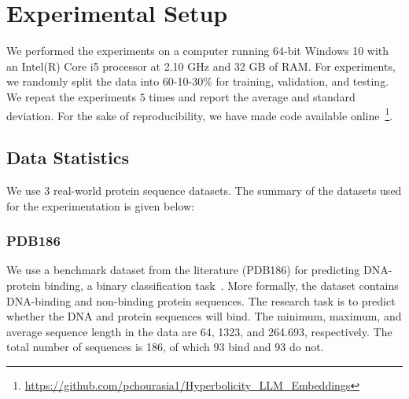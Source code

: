 \documentclass[]{Liebert_Author_revised}
\begin{document}
\section{Experimental Setup}
\label{sec_es}
We performed the experiments on a computer running 64-bit Windows 10 with an Intel(R) Core i5 processor at 2.10 GHz and 32 GB of RAM. For experiments, we randomly split the data into 60-10-30\% for training, validation, and testing. We repeat the experiments $5$ times and report the average and standard deviation.
For the sake of reproducibility, we have made code available online~\footnote{\url{https://github.com/pchourasia1/Hyperbolicity_LLM_Embeddings}}.

\subsection{Data Statistics}
\label{sub_sec_data_stats}
We use $3$ real-world protein sequence datasets. The summary of the datasets used for the experimentation is given below:

\subsubsection{PDB186}
We use a benchmark dataset from the literature (PDB186) for predicting DNA-protein binding, a binary classification task~\citeauthor{lou2014sequence}. More formally, the dataset contains DNA-binding and non-binding protein sequences. The research task is to predict whether the DNA and protein sequences will bind. The minimum, maximum, and average sequence length in the data are 64, 1323, and 264.693, respectively. The total number of sequences is 186, of which 93 bind and 93 do not.

\end{document}
